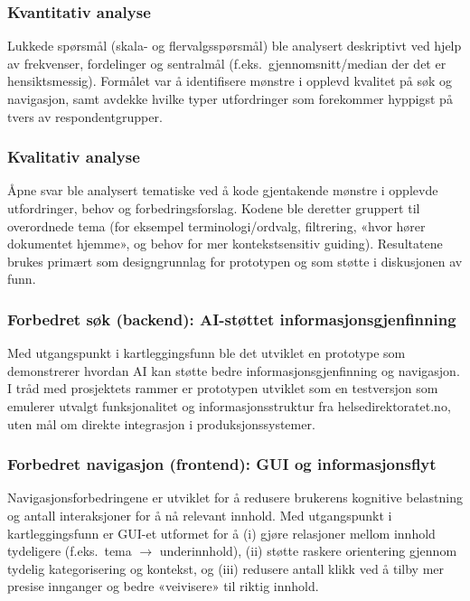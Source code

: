 \subsubsection{Kvantitativ analyse}
\label{sec:kvant}

Lukkede spørsmål (skala- og flervalgsspørsmål) ble analysert deskriptivt ved hjelp av frekvenser, fordelinger og sentralmål (f.eks.\ gjennomsnitt/median der det er hensiktsmessig). Formålet var å identifisere mønstre i opplevd kvalitet på søk og navigasjon, samt avdekke hvilke typer utfordringer som forekommer hyppigst på tvers av respondentgrupper.

\subsubsection{Kvalitativ analyse}
\label{sec:kval}

Åpne svar ble analysert tematiske ved å kode gjentakende mønstre i opplevde utfordringer, behov og forbedringsforslag. Kodene ble deretter gruppert til overordnede tema (for eksempel terminologi/ordvalg, filtrering, «hvor hører dokumentet hjemme», og behov for mer kontekstsensitiv guiding). Resultatene brukes primært som designgrunnlag for prototypen og som støtte i diskusjonen av funn.

\subsubsection{Forbedret søk (backend): AI-støttet informasjonsgjenfinning}
\label{sec:ai}

Med utgangspunkt i kartleggingsfunn ble det utviklet en prototype som demonstrerer hvordan AI kan støtte bedre informasjonsgjenfinning og navigasjon. I tråd med prosjektets rammer er prototypen utviklet som en testversjon som emulerer utvalgt funksjonalitet og informasjonsstruktur fra helsedirektoratet.no, uten mål om direkte integrasjon i produksjonssystemer. \cite{ProjectPlan}

\subsubsection{Forbedret navigasjon (frontend): GUI og informasjonsflyt}
\label{sec:navigasjon}

Navigasjonsforbedringene er utviklet for å redusere brukerens kognitive belastning og antall interaksjoner for å nå relevant innhold. Med utgangspunkt i kartleggingsfunn er GUI-et utformet for å (i) gjøre relasjoner mellom innhold tydeligere (f.eks.\ tema $\rightarrow$ underinnhold), (ii) støtte raskere orientering gjennom tydelig kategorisering og kontekst, og (iii) redusere antall klikk ved å tilby mer presise innganger og bedre «veivisere» til riktig innhold.


